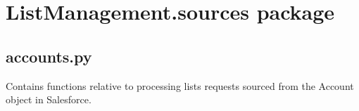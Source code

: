 \documentclass[letterpaper,10pt,english]{sphinxmanual}
\begin{document}
\chapter{ListManagement.sources package}
\label{\detokenize{index:module-ListManagement.sources}}\label{\detokenize{index:listmanagement-sources-package}}\label{\detokenize{index:module-ListManagement.sources.accounts}}

\section{accounts.py}
\label{\detokenize{index:accounts-py}}
Contains functions relative to processing
lists requests sourced from the Account
object in Salesforce.
\end{document}
